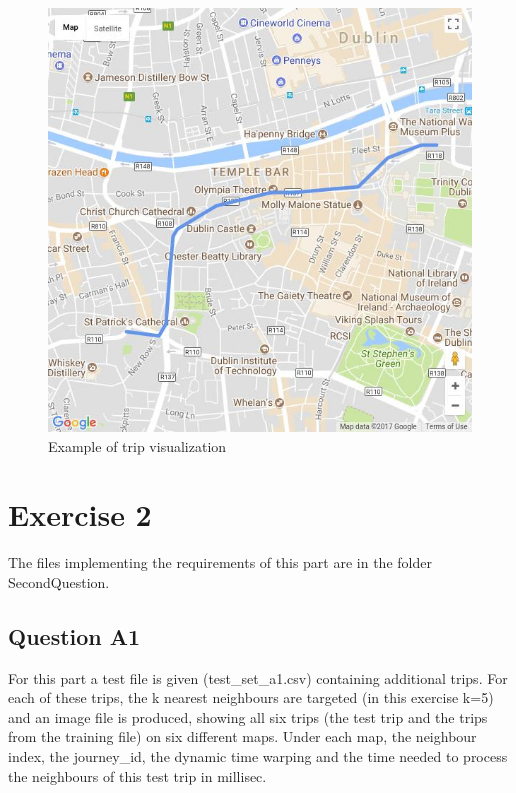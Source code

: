 \documentclass[12pt]{article}
\begin{document}
	\begin{figure} [H]
		\begin{center}
			\includegraphics [scale = 0.75] {questionCexample.jpg}
			\caption{Example of trip visualization}
		\end{center}
	\end{figure} 
	
	\section{Exercise 2}
	The files implementing the requirements of this part are in the folder SecondQuestion.
	
	\subsection{Question A1}
	For this part a test file is given (test\_set\_a1.csv) containing additional trips. For each of these trips, the k nearest neighbours are targeted (in this exercise k=5) and an image file is produced, showing all six trips (the test trip and the trips from the training file) on six different maps. Under each map, the neighbour index, the journey\_id, the dynamic time warping and the time needed to process the neighbours of this test trip in millisec.
	
\end{document}
